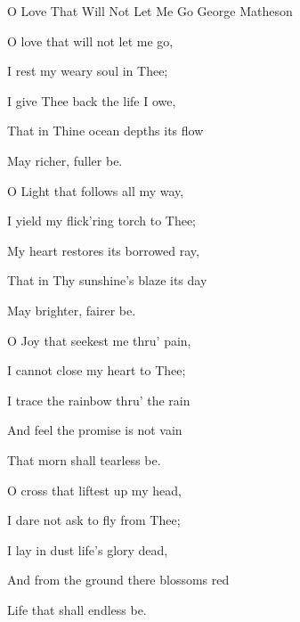 \documentclass[12pt]{book}
\begin{document}
\begin{song}{O Love That Will Not Let Me Go}{}
  {\SBPubDom}
  {George Matheson}
  {}
  {}

  \begin{SBVerse}
    O love that will not let me go,

    I rest my weary soul in Thee;

    I give Thee back the life I owe,

    That in Thine ocean depths its flow

    May richer, fuller be.
  \end{SBVerse}

  \begin{SBVerse}
    O Light that follows all my way,

    I yield my flick'ring torch to Thee;

    My heart restores its borrowed ray,

    That in Thy sunshine's blaze its day

    May brighter, fairer be.
  \end{SBVerse}

  \begin{SBVerse}
    O Joy that seekest me thru' pain,

    I cannot close my heart to Thee;

    I trace the rainbow thru' the rain

    And feel the promise is not vain

    That morn shall tearless be.
  \end{SBVerse}

  \begin{SBVerse}
    O cross that liftest up my head,

    I dare not ask to fly from Thee;

    I lay in dust life's glory dead,

    And from the ground there blossoms red

    Life that shall endless be.
  \end{SBVerse}
\end{song}
\end{document}
